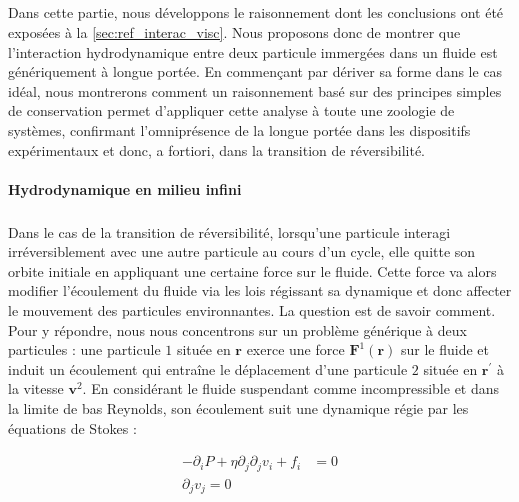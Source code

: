 \label{sec:Annexe_Interactions_Hydro}

\subparagraph{}Dans cette partie, nous développons le raisonnement dont les conclusions ont été exposées à la \autoref{sec:ref_interac_visc}. Nous proposons donc de montrer que l'interaction hydrodynamique entre deux particule immergées dans un fluide est génériquement à longue portée. En commençant par dériver sa forme dans le cas idéal, nous montrerons comment un raisonnement basé sur des principes simples de conservation permet d'appliquer cette analyse à toute une zoologie de systèmes, confirmant l'omniprésence de la longue portée dans les dispositifs expérimentaux et donc, a fortiori, dans la transition de réversibilité.

\paragraph{Hydrodynamique en milieu infini}

\subparagraph{}Dans le cas de la transition de réversibilité, lorsqu'une particule interagi irréversiblement avec une autre particule au cours d'un cycle, elle quitte son orbite initiale en appliquant une certaine force sur le fluide. Cette force va alors modifier l'écoulement du fluide via les lois régissant sa dynamique et donc affecter le mouvement des particules environnantes. La question est de savoir comment. Pour y répondre, nous nous concentrons sur un problème générique à deux particules : une particule $1$ située en $\mathbf{r}$ exerce une force $\mathbf{F}^1(\mathbf{r})$ sur le fluide et induit un écoulement qui entraîne le déplacement d'une particule $2$ située en $\mathbf{r}^\prime$ à la vitesse $\mathbf{v}^2$. En considérant le fluide suspendant comme incompressible et dans la limite de bas Reynolds, son écoulement suit une dynamique régie par les équations de Stokes :

\begin{equation}
\begin{aligned}
	-\partial_i P + \eta \partial_j\partial_j v_i + f_i &= 0 \\
	\partial_j v_j = 0
\end{aligned}
\end{equation}

